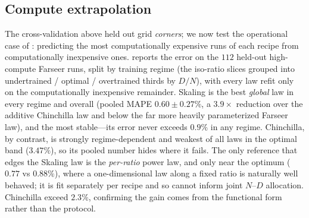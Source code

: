 \documentclass[]{fairmeta}
\newcommand{\ska}{Skaling}
\begin{document}
\subsection{Compute extrapolation}
\label{sec:results_isoratio}
The cross-validation above held out grid \emph{corners}; we now test the operational case of : predicting the most computationally expensive runs of each recipe from computationally inexpensive ones.  reports the error on the $112$ held-out high-compute Farseer runs, split by training regime (the iso-ratio slices grouped into undertrained / optimal / overtrained thirds by $D/N$), with every law refit only on the computationally inexpensive remainder. \ska{} is the best \emph{global} law in every regime and overall (pooled MAPE $0.60{\pm}0.27\%$, a $3.9\times$ reduction over the additive Chinchilla law and below the far more heavily parameterized Farseer law), and the most stable---its error never exceeds $0.9\%$ in any regime. Chinchilla, by contrast, is strongly regime-dependent and weakest of all laws in the optimal band ($3.47\%$), so its pooled number hides where it fails. The only reference that edges the \ska{} law is the \emph{per-ratio} power law, and only near the optimum ($0.77$ vs $0.88\%$), where a one-dimensional law along a fixed ratio is naturally well behaved; it is fit separately per recipe and so cannot inform joint $N$--$D$ allocation. Chinchilla exceed $2.3\%$, confirming the gain comes from the functional form rather than the protocol.
\end{document}

